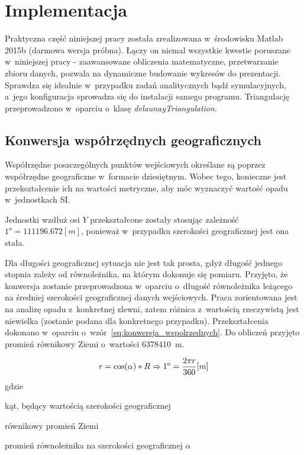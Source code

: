 \chapter{Implementacja}
\label{cha:implementacja}

Praktyczna część niniejszej pracy została zrealizowana w~środowisku Matlab 2015b (darmowa wersja próbna). Łączy on niemal wszystkie kwestie poruszane w~niniejszej pracy - zaawansowane obliczenia matematyczne, przetwarzanie zbioru danych, pozwala na dynamiczne budowanie wykresów do prezentacji. Sprawdza się idealnie w~przypadku zadań analitycznych bądź symulacyjnych, a~jego konfiguracja sprowadza się do instalacji samego programu. Triangulację przeprowadzono w~oparciu o~klasę \textit{delaunayTriangulation}.

\section{Konwersja współrzędnych geograficznych}
Współrzędne poszczególnych punktów wejściowych określane są poprzez współrzędne geograficzne w~formacie dziesiętnym. Wobec tego, konieczne jest przekształcenie ich na wartości metryczne, aby móc wyznaczyć wartość opadu w~jednostkach SI.

Jednostki wzdłuż osi $Y$ przekształcone zostały stosując zależność $1^o=111196.672 [m]$, ponieważ w~przypadku szerokości geograficznej jest ona stała.

Dla długości geograficznej sytuacja nie jest tak prosta, gdyż długość jednego stopnia zależy od równoleżnika, na którym dokonuje się pomiaru. Przyjęto, że konwersja zostanie przeprowadzona w~oparciu o~długość równoleżnika leżącego na średniej szerokości geograficznej danych wejściowych. Praca zorientowana jest na analizę opadu z~konkretnej zlewni, zatem różnica z~wartością rzeczywistą jest niewielka (zostanie podana dla konkretnego przypadku). Przekształcenia dokonano w~oparciu o~wzór~\ref{eq:konwersja_wspolrzednych}. Do obliczeń przyjęto promień równikowy Ziemi o~wartości 6378410~m.

\begin{equation}
	r = \cos(\alpha)*R \Rightarrow 1^o = \frac{2 \pi r}{360} [m] \\
	\label{eq:konwersja_wspolrzednych}
\end{equation}
gdzie
\begin{description}[leftmargin=2cm, itemsep=0cm, labelsep=0cm]
	\item[$\alpha$] kąt, będący wartością szerokości geograficznej
	\item[$R$] równikowy promień Ziemi
	\item[$r$] promień równoleżnika na szerokości geograficznej $\alpha$
\end{description}

